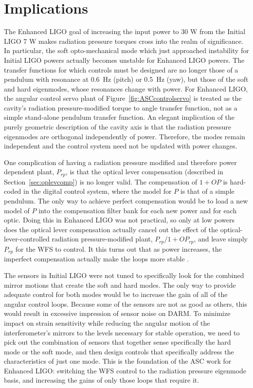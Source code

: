 \section{Implications}
The Enhanced LIGO goal of increasing the input power to 30 W from the
Initial LIGO 7 W makes radiation pressure torques cross into the realm
of significance. In particular, the soft opto-mechanical mode which
just approached instability for Initial LIGO powers actually becomes
unstable for Enhanced LIGO powers. The transfer functions for which
controls must be designed are no longer those of a pendulum with
resonance at 0.6~Hz (pitch) or 0.5~Hz (yaw), but those of the soft and
hard eigenmodes, whose resonances change with power. For Enhanced
LIGO, the angular control servo plant of
Figure~\ref{fig:ASCcontrolservo} is treated as the cavity's radiation
pressure-modified torque to angle transfer function, not as a simple
stand-alone pendulum transfer function. An elegant implication of the
purely geometric description of the cavity axis is that the radiation
pressure eigenmodes are orthogonal independently of power. Therefore,
the modes remain independent and the control system need not be
updated with power changes.

One complication of having a radiation pressure modified and therefore
power dependent plant, $P_{rp}$, is that the optical lever
compensation (described in Section~\ref{sec:oplevcomp}) is no longer
valid. The compensation of $1+OP$ is hard-coded in the digital control
system, where the model for $P$ is that of a simple pendulum. The only
way to achieve perfect compensation would be to load a new model of
$P$ into the compensation filter bank for each new power and for each
optic. Doing this in Enhanced LIGO was not practical, so only at low
powers does the optical lever compensation actually cancel out the
effect of the optical-lever-controlled radiation pressure-modified
plant, $P_{rp}/1+OP_{rp}$, and leave simply $P_{rp}$ for the WFS to
control. It this turns out that as power increases, the imperfect
compensation actually make the loops more stable
\cite{Barsotti2008}.

The sensors in Initial LIGO were not tuned to specifically look for
the combined mirror motions that create the soft and hard modes. The
only way to provide adequate control for both modes would be to
increase the gain of all of the angular control loops. Because some of
the sensors are not as good as others, this would result in excessive
impression of sensor noise on DARM. To minimize impact on strain
sensitivity while reducing the angular motion of the interferometer's
mirrors to the levels necessary for stable operation, we need to pick
out the combination of sensors that together sense specifically the
hard mode or the soft mode, and then design controls that specifically
address the characteristics of just one mode. This is the foundation
of the ASC work for Enhanced LIGO: switching the WFS control to the
radiation pressure eigenmode basis, and increasing the gains of only
those loops that require it. 




